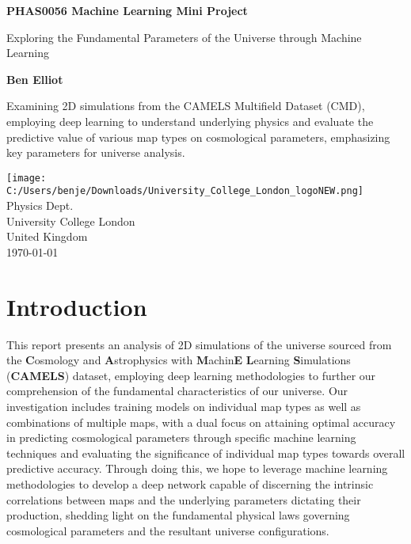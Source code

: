 \documentclass[11pt]{scrartcl}
\begin{document}
\begin{titlepage}
   \begin{center}
       \vspace*{1cm}

       \textbf{PHAS0056 Machine Learning Mini Project}

       \vspace{0.5cm}
	Exploring the Fundamental Parameters of the Universe through Machine Learning
            
       \vspace{1.5cm}

       \textbf{Ben Elliot}

       \vfill
            
       Examining 2D simulations from the CAMELS Multifield Dataset (CMD), employing deep learning to understand underlying physics and evaluate the predictive value of various map types on cosmological parameters, emphasizing key parameters for universe analysis.

       \vspace{0.8cm}
     
      \texttt{[image: C:/Users/benje/Downloads/University\_College\_London\_logoNEW.png]}\\
       Physics Dept.\\
       University College London\\
       United Kingdom\\
       \today
            
   \end{center}
\end{titlepage}


\section{Introduction}
This report presents an analysis of 2D simulations of the universe sourced from the \textbf{C}osmology and \textbf{A}strophysics with \textbf{M}achin\textbf{E} \textbf{L}earning \textbf{S}imulations (\textbf{CAMELS}) dataset, employing deep learning methodologies to further our comprehension of the fundamental characteristics of our universe. Our investigation includes training models on individual map types as well as combinations of multiple maps, with a dual focus on attaining optimal accuracy in predicting cosmological parameters through specific machine learning techniques and evaluating the significance of individual map types towards overall predictive accuracy. Through doing this, we hope to leverage machine learning methodologies to develop a deep network capable of discerning the intrinsic correlations between maps and the underlying parameters dictating their production, shedding light on the fundamental physical laws governing cosmological parameters and the resultant universe configurations.
\end{document}
